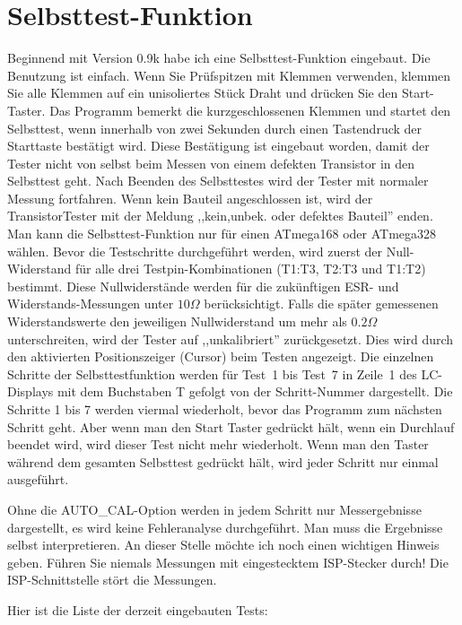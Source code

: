 
\section{Selbsttest-Funktion}
\label{sec:selftest}
Beginnend mit Version 0.9k habe ich eine Selbsttest-Funktion eingebaut.
Die Benutzung ist einfach.
Wenn Sie Prüfspitzen mit Klemmen verwenden, klemmen Sie alle Klemmen auf ein unisoliertes Stück Draht und drücken Sie
den Start-Taster.
Das Programm bemerkt die kurzgeschlossenen Klemmen und startet den Selbsttest, wenn innerhalb von
zwei Sekunden durch einen Tastendruck der Starttaste bestätigt wird. Diese Bestätigung ist eingebaut
worden, damit der Tester nicht von selbst beim Messen von einem defekten Transistor in den Selbsttest geht.
Nach Beenden des Selbsttestes wird der Tester mit normaler Messung fortfahren.
Wenn kein Bauteil angeschlossen ist, wird der TransistorTester mit der
Meldung ,,kein,unbek. oder defektes Bauteil'' enden.
Man kann die Selbsttest-Funktion nur für einen ATmega168 oder ATmega328 wählen.
Bevor die Testschritte durchgeführt werden, wird zuerst der Null-Widerstand für alle drei Testpin-Kombinationen
(T1:T3, T2:T3 und T1:T2) bestimmt. Diese Nullwiderstände werden für die zukünftigen ESR- und Widerstands-Messungen
unter \(10 \Omega\) berücksichtigt.
Falls die später gemessenen Widerstandswerte den jeweiligen Nullwiderstand um mehr als \(0.2 \Omega\) unterschreiten,
wird der Tester auf ,,unkalibriert'' zurückgesetzt. 
Dies wird durch den aktivierten Positionszeiger (Cursor)  beim Testen angezeigt.
Die einzelnen Schritte der Selbsttestfunktion werden für Test~1 bis Test~7 in Zeile~1 des LC-Displays mit dem Buchstaben T
gefolgt von der Schritt-Nummer dargestellt.
Die Schritte 1 bis 7 werden viermal wiederholt, bevor das Programm zum nächsten Schritt geht.
Aber wenn man den Start Taster gedrückt hält, wenn ein Durchlauf beendet wird, wird dieser Test nicht
mehr wiederholt.
Wenn man den Taster während dem gesamten Selbsttest gedrückt hält, wird jeder Schritt nur einmal ausgeführt.

Ohne die AUTO\_CAL-Option werden in jedem Schritt nur Messergebnisse dargestellt, es wird keine Fehleranalyse durchgeführt.
Man  muss die Ergebnisse selbst interpretieren.
An dieser Stelle möchte ich noch einen wichtigen Hinweis geben. Führen Sie niemals Messungen mit
eingestecktem ISP-Stecker durch!
Die ISP-Schnittstelle stört die Messungen.

\vspace{1cm}
Hier ist die Liste der derzeit eingebauten Tests:
\vspace{1cm}

